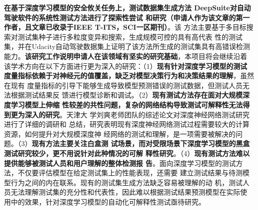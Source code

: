\textbf{在基于深度学习模型的安全攸关任务上，测试数据集生成方法
DeepSuite对自动驾驶软件的系统性测试方法进行了探索性尝试
和研究（申请人作为该文章的第一作者，且文章已收录于IEEE T-ITS，SCI一区期刊）}。该
方法主要基于多目标搜索对测试集种子进行多粒度变异和搜索，生成规模可控的具有高代表
性的测试集，并在Udacity自动驾驶数据集上证明了该方法所生成的测试集具有高错误检测
能力。\textbf{该研究工作说明申请人在该领域有坚实的研究基础}，本项目将会继续沿着
该学术方向在以下方面进行更为深入的研究：（1）\textbf{现有针对深度学习模型的测试
度量指标依赖于对神经元的值覆盖，缺乏对模型决策行为和决策结果的理解}，虽然在现有
度量指标的引导下能够生成导致模型预测错误的测试数据，但测试人员无法根据测试结果反
馈进行模型诊断和调试。（2）\textbf{现有测试方法存在面对大规模深度学习模型上伸缩
性较差的共性问题，复杂的网络结构导致测试可解释性无法得到更为深入的研究}。天津大
学刘爽老师团队的综述论文对深度神经网络测试研究进行了详细的调研和
总结，研究表明现有深度神经网络测试过程需要较大的计算资源，如何提升对大规模深度神
经网络的测试和理解，是一项需要被解决的问题。（3）\textbf{现有方法主要关注白盒测
试场景，而对受限场景下深度学习模型的黑盒测试研究较少，更不用说针对此种情况的可解
释性研究}。（4）\textbf{现有测试方法难以提供能够被测试人员和用户理解的整体检测报
告}。面向深度学习模型的测试方法，不仅要评估模型在给定测试集上的性能表现，还需要
建立测试结果与待测模型行为之间的内在联系。现有的测试集生成方法缺乏容易被理解的动
机，测试人员无法理解测试集的充分性和代表性，因此难以根据测试结果预测模型在实际使
用中的效果，针对深度学习模型的自动化可解释性测试亟待研究。



\begin{spacing}{1.3} %
	 \songti
	
	
	\vspace{11bp}
\end{spacing}
